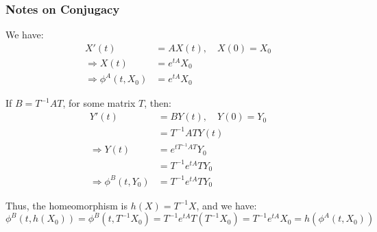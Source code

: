         \subsubsection{Notes on Conjugacy}
            \begin{minipage}[t]{0.49\textwidth}
                We have:
                \begin{align*}
                    X'(t)&=AX(t),\quad
                    X(0)=X_{0}\\
                    \Rightarrow
                    X(t)&=e^{tA}X_{0}\\
                    \Rightarrow
                    \phi^{A}(t,X_{0})
                    &=e^{tA}X_{0}
                \end{align*}
            \end{minipage}
            \vline
            \hfill
            \begin{minipage}[t]{0.49\textwidth}
                If $B=T^{-1}AT$, for some matrix $T$, then:
                \begin{align*}
                    Y'(t)&=BY(t),\quad
                    Y(0)=Y_{0}\\
                    &=T^{-1}ATY(t)\\
                    \Rightarrow
                    Y(t)
                    &=e^{tT^{-1}AT}Y_{0}\\
                    &=T^{-1}e^{tA}TY_{0}\\
                    \Rightarrow
                    \phi^{B}(t,Y_{0})
                    &=T^{-1}e^{tA}TY_{0}
                \end{align*}
            \end{minipage}
            Thus, the homeomorphism is $h(X)=T^{-1}X$,
            and we have:
            \begin{equation*}
                \phi^{B}(t,h(X_{0}))
                =\phi^{B}(t,T^{-1}X_{0})
                =T^{-1}e^{tA}T(T^{-1}X_{0})
                =T^{-1}e^{tA}X_{0}
                =h(\phi^{A}(t,X_{0}))
            \end{equation*}